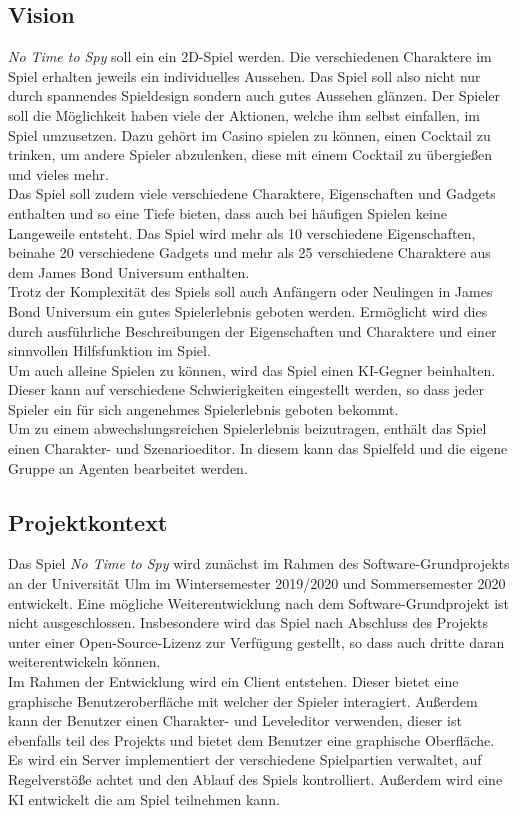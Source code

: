 \subsection{Vision}
\textit{No Time to Spy} soll ein ein 2D-Spiel werden. Die verschiedenen Charaktere im Spiel erhalten jeweils ein individuelles Aussehen. Das Spiel soll also nicht nur durch spannendes Spieldesign sondern auch gutes Aussehen glänzen. Der Spieler soll die Möglichkeit haben viele der Aktionen, welche ihm selbst einfallen, im Spiel umzusetzen. Dazu gehört im Casino spielen zu können, einen Cocktail zu trinken, um andere Spieler abzulenken, diese mit einem Cocktail zu übergießen und vieles mehr.\\
Das Spiel soll zudem viele verschiedene Charaktere, Eigenschaften und Gadgets enthalten und so eine Tiefe bieten, dass auch bei häufigen Spielen keine Langeweile entsteht. Das Spiel wird mehr als 10 verschiedene Eigenschaften, beinahe 20 verschiedene Gadgets und mehr als 25 verschiedene Charaktere aus dem James Bond Universum enthalten. \\
Trotz der Komplexität des Spiels soll auch Anfängern oder Neulingen in James Bond Universum ein gutes Spielerlebnis geboten werden. Ermöglicht wird dies durch ausführliche Beschreibungen der Eigenschaften und Charaktere und einer sinnvollen Hilfsfunktion im Spiel.\\
Um auch alleine Spielen zu können, wird das Spiel einen KI-Gegner beinhalten. Dieser kann auf verschiedene Schwierigkeiten eingestellt werden, so dass jeder Spieler ein für sich angenehmes Spielerlebnis geboten bekommt.\\
Um zu einem abwechslungsreichen Spielerlebnis beizutragen, enthält das Spiel einen Charakter- und Szenarioeditor. In diesem kann das Spielfeld und die eigene Gruppe an Agenten bearbeitet werden. 

\subsection{Projektkontext}
Das Spiel \textit{No Time to Spy} wird zunächst im Rahmen des Software-Grundprojekts an der Universität Ulm im Wintersemester 2019/2020 und Sommersemester 2020 entwickelt.
Eine mögliche Weiterentwicklung nach dem Software-Grundprojekt ist nicht ausgeschlossen. Insbesondere wird das Spiel nach Abschluss des Projekts unter einer Open-Source-Lizenz zur Verfügung gestellt, so dass auch dritte daran weiterentwickeln können.\\

Im Rahmen der Entwicklung wird ein Client entstehen. Dieser bietet eine graphische Benutzeroberfläche mit welcher der Spieler interagiert. Außerdem kann der Benutzer einen Charakter- und Leveleditor verwenden, dieser ist ebenfalls teil des Projekts und bietet dem Benutzer eine graphische Oberfläche.\\
Es wird ein Server implementiert der verschiedene Spielpartien verwaltet, auf Regelverstöße achtet und den Ablauf des Spiels kontrolliert. Außerdem wird eine KI entwickelt die am Spiel teilnehmen kann.
